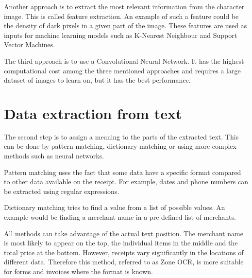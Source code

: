 \documentclass[
  digital, %
  table,   %
  oneside, %
  lof,     %
  lot,     %
]{fithesis3}
\begin{document}
Another approach is to extract the most relevant information from the character image. This is called feature extraction. An example of such a feature could be the density of dark pixels in a given part of the image. These features are used as inputs for machine learning models such as K-Nearest Neighbour and Support Vector Machines. \cite{Singh2011Feature}

The third approach is to use a Convolutional
Neural Network. It has the highest computational cost among the three mentioned approaches and requires a large dataset of images to learn on, but it has the best performance. \cite{Shreya2019OCRCNN}

\section{Data extraction from text}
The second step is to assign a meaning to the parts of the extracted text. This can be done by pattern matching, dictionary matching or using more complex methods such as neural networks. 

Pattern matching uses the fact that some data have a specific format compared to other data available on the receipt. For example, dates and phone numbers can be extracted using regular expressions.

Dictionary matching tries to find a value from a list of possible values. An example would be finding a merchant name in a pre-defined list of merchants.

All methods can take advantage of the actual text position. The merchant name is most likely to appear on the top, the individual items in the middle and the total price at the bottom. However, receipts vary significantly in the locations of different data. Therefore this method, referred to as Zone OCR, is more suitable for forms and invoices where the format is known.
\end{document}

